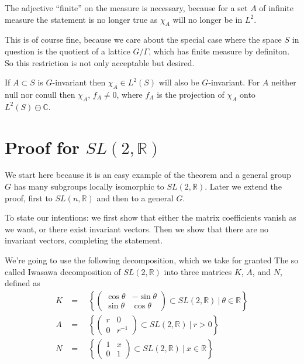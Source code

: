 \documentclass[
  12pt
]{article}
\theoremstyle{break}
\theoremstyle{plain}
\begin{document}
  The adjective ``finite'' on the measure is necessary, because for a set
  $A$ of infinite measure the statement is no longer true as $\chi_A$
  will no longer be in $L^2$.

  This is of course fine, because we care about the special case where the
  space $S$ in question is the quotient of a lattice $G/\Gamma$, which has
  finite measure by definiton. So this restriction is not only acceptable but
  desired.

  If $A\subset S$ is $G$-invariant then $\chi_A\in L^2(S)$ will also
  be $G$-invariant. 
  For $A$ neither null nor conull then
  $\chi_A$, $f_A \neq 0$, where $f_A$ is the projection of
  $\chi_A$ onto $L^2(S) \ominus \mathbb{C}$.




\hypertarget{proof-for-sl2r}{%
\section{Proof for \texorpdfstring{$SL(2, \mathbb{R})$}{SL(2, R)}}\label{proof-for-sl2r}}


  We start here because it is an easy example of the theorem and a general
  group $G$ has many subgroups locally isomorphic to
  $SL(2, \mathbb{R})$. Later we extend the proof, first to
  $SL(n, \mathbb{R})$ and then to a general $G$.

  To state our intentions: we first show that either the matrix
  coefficients vanish as we want, or there exist invariant vectors. Then
  we show that there are no invariant vectors, completing the statement.

  We're going to use the following decomposition, which we take for
  granted 
  The so called Iwasawa decomposition of $SL(2, \mathbb{R})$ into three
  matrices $K$, $A$, and $N$, defined as
  \begin{align}
  K & =\quad \left\{ \begin{pmatrix} \cos\theta & -\sin\theta \\ \sin\theta & \cos\theta\end{pmatrix} \subset SL(2, \mathbb{R})  \ | \ \theta \in \mathbb{R} \right\} \\
  A & =\quad \left\{ \begin{pmatrix} r & 0 \\ 0 & r^{-1} \end{pmatrix} \subset SL(2, \mathbb{R})  \ | \ r > 0 \right\} \\
  N & =\quad \left\{ \begin{pmatrix} 1 & x \\ 0 & 1 \end{pmatrix} \subset SL(2, \mathbb{R})  \ | \ x \in \mathbb{R} \right\}\\
  \end{align}
\end{document}
